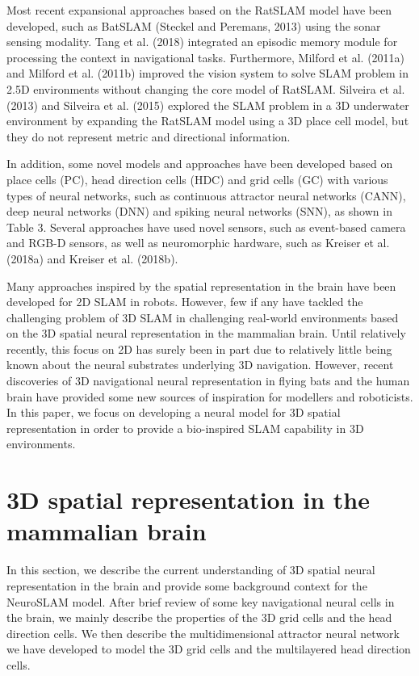 Most recent expansional approaches based on the RatSLAM model have been developed, such as BatSLAM (Steckel and Peremans, 2013) using the sonar sensing modality. 
Tang et al. (2018) integrated an episodic memory module for processing the context in navigational tasks. 
Furthermore, Milford et al. (2011a) and Milford et al. (2011b) improved the vision system to solve SLAM problem in 2.5D environments without changing the core model of RatSLAM. 
Silveira et al. (2013) and Silveira et al. (2015) explored the SLAM problem in a 3D underwater environment by expanding the RatSLAM model using a 3D place cell model, but they do not represent metric and directional information.


In addition, some novel models and approaches have been developed based on place cells (PC), head direction cells (HDC) and grid cells (GC) with various types of neural networks, such as continuous attractor neural networks (CANN), deep neural networks (DNN) and spiking neural networks (SNN), as shown in Table 3. 
Several approaches have used novel sensors, such as event-based camera and RGB-D sensors, as well as neuromorphic hardware, such as Kreiser et al. (2018a) and Kreiser et al. (2018b).


Many approaches inspired by the spatial representation in the brain have been developed for 2D SLAM in robots. 
However, few if any have tackled the challenging problem of 3D SLAM in challenging real-world environments based on the 3D spatial neural representation in the mammalian brain. 
Until relatively recently, this focus on 2D has surely been in part due to relatively little being known about the neural substrates underlying 3D navigation. 
However, recent discoveries of 3D navigational neural representation in flying bats and the human brain have provided some new sources of inspiration for modellers and roboticists. 
In this paper, we focus on developing a neural model for 3D spatial representation in order to provide a bio-inspired SLAM capability in 3D environments.


\section{3D spatial representation in the mammalian brain}

In this section, we describe the current understanding of 3D spatial neural representation in the brain and provide some background context for the NeuroSLAM model. 
After brief review of some key navigational neural cells in the brain, we mainly describe the properties of the 3D grid cells and the head direction cells. 
We then describe the multidimensional attractor neural network we have developed to model the 3D grid cells and the multilayered head direction cells.


